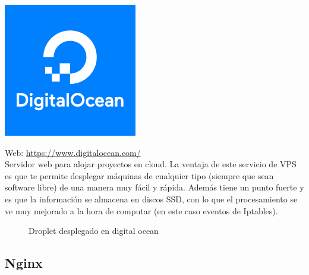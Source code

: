 \begin{center}\includegraphics[scale=0.35]{diagramas/docean-logo.png}\end{center}

Web: \url{https://www.digitalocean.com/}\\

Servidor web para alojar proyectos en cloud. La ventaja de este servicio de VPS es que te permite desplegar máquinas de cualquier tipo (siempre que sean software libre) de una manera muy fácil y rápida. Además tiene un punto fuerte y es que la información se almacena en discos SSD, con lo que el procesamiento se ve muy mejorado a la hora de computar (en este caso eventos de Iptables).\\

\begin{figure}[H]
\caption{Droplet desplegado en digital ocean}
\end{figure}

\subsection{Nginx}


